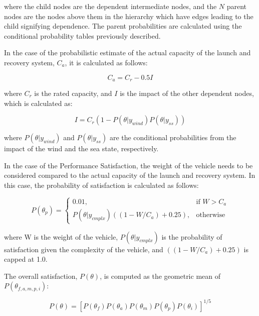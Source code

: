 \documentclass{svproc}
\begin{document}
\noindent
where the child nodes are the dependent intermediate nodes, and the $N$ parent nodes are the nodes above them in the hierarchy which have edges leading to the child signifying dependence. The parent probabilities are calculated using the conditional probability tables previously described. 

In the case of the probabilistic estimate of the actual capacity of the launch and recovery system, $C_a$, it is calculated as follows:

\begin{equation}
    C_a = C_r - 0.5I
\end{equation}

\noindent
where $C_r$ is the rated capacity, and $I$ is the impact of the other dependent nodes, which is calculated as: 

\begin{equation}
    I = C_r(1-P(\theta|y_{wind})P(\theta|y_{ss}))
\end{equation}

\noindent
where $P(\theta|y_{wind})$ and $P(\theta|y_{ss})$ are the conditional probabilities from the impact of the wind and the sea state, respectively. 

In the case of the Performance Satisfaction, the weight of the vehicle needs to be considered compared to the actual capacity of the launch and recovery system. In this case, the probability of satisfaction is calculated as follows:

\begin{equation}
    P(\theta_p) = 
    \begin{cases}
    0.01,& \text{if } W > C_a\\
    P(\theta|y_{cmplx})((1-W/C_a) + 0.25),              & \text{otherwise}
\end{cases}
\end{equation}

\noindent
where W is the weight of the vehicle, $P(\theta|y_{cmplx})$ is the probability of satisfaction given the complexity of the vehicle, and $((1-W/C_a) + 0.25)$ is capped at 1.0. 

The overall satisfaction, $P(\theta)$, is computed as the geometric mean of $P(\theta_{f,a,m,p,i})$:

\begin{equation}
    P(\theta) = [P(\theta_f)P(\theta_a)P(\theta_m)P(\theta_p)P(\theta_i)]^{1/5}
\end{equation}
\end{document}
